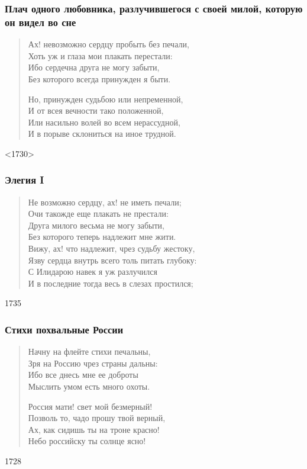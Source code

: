\documentclass{beamer}
\begin{document}
%

\begin{frame}
\frametitle{Плач одного любовника, разлучившегося с своей милой, которую он видел во сне}

\begin{verse}
Ах! невозможно сердцу пробыть без печали,\\
Хоть уж и глаза мои плакать перестали:\\
Ибо сердечна друга не могу забыти,\\
Без которого всегда принужден я быти.

Но, принужден судьбою или непременной,\\
И от всея вечности тако положенной,\\
Или насильно волей во всем нерассудной,\\
И в порыве склониться на иное трудной.

\end{verse}
<1730>
\end{frame}

\begin{frame}
\frametitle{Элегия I}

\begin{verse}
Не возможно сердцу, ах! не иметь печали;\\
Очи такожде еще плакать не престали:\\
Друга милого весьма не могу забыти,\\
Без которого теперь надлежит мне жити.\\
Вижу, ах! что надлежит, чрез судьбу жестоку,\\
Язву сердца внутрь всего толь питать глубоку:\\
С Илидарою навек я уж разлучился\\
И в последние тогда весь в слезах простился;
\end{verse}
1735
\end{frame}



\begin{frame}
\frametitle{Стихи похвальные России}

\begin{verse}
Начну на флейте стихи печальны,\\
Зря на Россию чрез страны дальны:\\
Ибо все днесь мне ее доброты\\
Мыслить умом есть много охоты.

Россия мати! свет мой безмерный!\\
Позволь то, чадо прошу твой верный,\\
Ах, как сидишь ты на троне красно!\\
Небо российску ты солнце ясно!

\end{verse}
1728

\end{frame}
\end{document}
